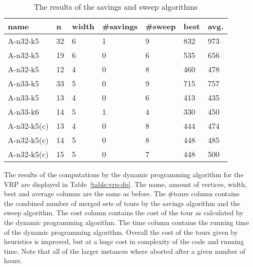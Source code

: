 \documentclass[12pt]{article}
\begin{document}
    \begin{table}
    \begin{tabular}{l l l l l l l}
        name        & n     & width & \#savings & \#sweep   & best  & avg. \\ \hline
        A-n32-k5    & 32    & 6     & 1         & 9         & 832   & 973 \\
        A-n32-k5    & 19    & 6     & 0         & 6         & 535   & 656 \\
        A-n32-k5    & 12    & 4     & 0         & 8         & 460   & 478 \\
        A-n33-k5    & 33    & 5     & 0         & 9         & 715   & 757 \\
        A-n33-k5    & 13    & 4     & 0         & 6         & 413   & 435 \\
        A-n33-k6    & 14    & 5     & 1         & 4         & 330   & 450 \\
        A-n32-k5(c) & 13    & 4     & 0         & 8         & 444   & 474 \\
        A-n32-k5(c) & 14    & 5     & 0         & 8         & 448   & 485 \\
        A-n32-k5(c) & 15    & 5     & 0         & 7         & 448   & 500 \\
    \end{tabular}
    \caption{The results of the savings and sweep algorithms}
    \label{table:vrp-heuristics}
    \end{table}

    The results of the computations by the dynamic programming algorithm for the VRP are displayed
    in Table~\ref{table:vrp-dp}. The name, amount of vertices, width, best and average columns are
    the same as before. The \#tours column contains the combined number of merged sets of tours by
    the savings algorithm and the sweep algorithm. The cost column contains the cost of the tour as
    calculated by the dynamic programming algorithm. The time column contains the running time of
    the dynamic programming algorithm.
    Overall the cost of the tours given by heuristics is improved, but at a huge cost in complexity
    of the code and running time.
    Note that all of the larger instances where aborted after a given number of hours.
\end{document}
